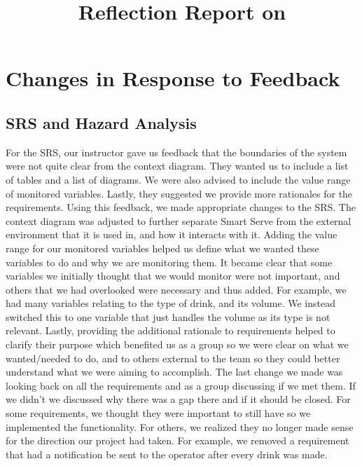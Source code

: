 \documentclass{article}
\title{Reflection Report on \progname}
\author{\authname}
\date{}
\begin{document}
\maketitle

\section{Changes in Response to Feedback}

\subsection{SRS and Hazard Analysis}
For the SRS, our instructor gave us feedback that the boundaries of the system were not quite clear from the context diagram. They wanted us to include a list of tables and a list of diagrams. We were also advised to include the value range of monitored variables. Lastly, they suggested we provide more rationales for the requirements. Using this feedback, we made appropriate changes to the SRS. The context diagram was adjusted to further separate Smart Serve from the external environment that it is used in, and how it interacts with it. Adding the value range for our monitored variables helped us define what we wanted these variables to do and why we are monitoring them. It became clear that some variables we initially thought that we would monitor were not important, and others that we had overlooked were necessary and thus added. For example, we had many variables relating to the type of drink, and its volume. We instead switched this to one variable that just handles the volume as its type is not relevant. Lastly, providing the additional rationale to requirements helped to clarify their purpose which benefited us as a group so we were clear on what we wanted/needed to do, and to others external to the team so they could better understand what we were aiming to accomplish. The last change we made was looking back on all the requirements and as a group discussing if we met them. If we didn't we discussed why there was a gap there and if it should be closed. For some requirements, we thought they were important to still have so we implemented the functionality. For others, we realized they no longer made sense for the direction our project had taken. For example, we removed a requirement that had a notification be sent to the operator after every drink was made.\\

\end{document}
